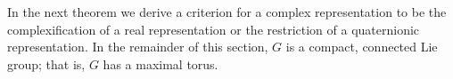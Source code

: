 In the next theorem we derive a criterion for a complex representation to be the complexification of a real representation or the restriction of a quaternionic representation. In the remainder of this section, $G$ is a compact, connected Lie group; that is, $G$ has a maximal torus.
